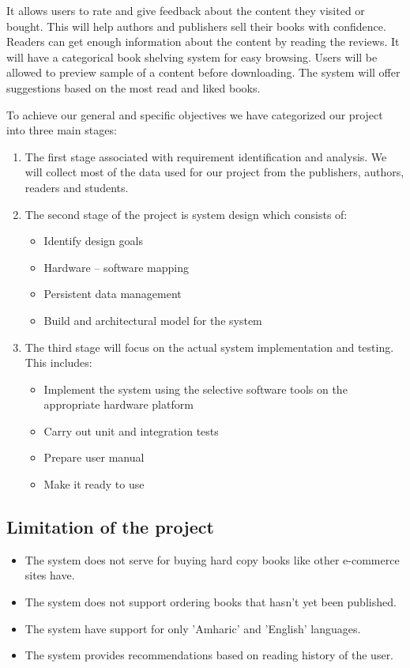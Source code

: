 It allows users to rate and give feedback about the content they visited or bought. This will help authors and publishers sell their books with confidence. Readers can get enough information about the content by reading the reviews. It will have a categorical book shelving system for easy browsing. Users will be allowed to preview sample of a content before downloading. The system will offer suggestions based on the most read and liked books.

To achieve our general and specific objectives we have categorized our project into three main stages:

\begin{enumerate}
	\item The first stage associated with requirement identification and analysis. We will collect most of the data used for our project from the publishers, authors, readers and students.
	
	\item The second stage of the project is system design which consists of:	
	\begin{itemize}
		\item Identify design goals
		\item Hardware – software mapping
		\item Persistent data management
		\item Build and architectural model for the system
	\end{itemize}

	\item The third stage will focus on the actual system implementation and testing. This includes:
	\begin{itemize}
		\item Implement the system using the selective software tools on the appropriate hardware platform
		\item Carry out unit and integration tests
		\item Prepare user manual
		\item Make it ready to use
	\end{itemize}
\end{enumerate}

	\subsection{Limitation of the project}

\begin{itemize}
\item The system does not serve for buying hard copy books like other e-commerce sites have.
\item The system does not support ordering books that hasn't yet been published.
\item The system have support for only 'Amharic' and 'English' languages.
\item The system provides recommendations based on reading history of the user.
\end{itemize}

